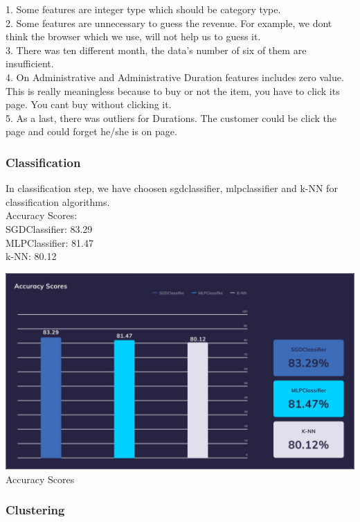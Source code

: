 \documentclass[onecolumn]{article}
\begin{document}
1. Some features are integer type which should be category type.\\
2. Some features are unnecessary to guess the revenue. For example, we dont think the browser which we use, will not help us to guess it.\\
3. There was ten different month, the data's number of six of them are insufficient.\\
4. On Administrative and Administrative Duration features includes zero value. This is really meaningless because to buy or not the item, you have to click its page. You cant buy without clicking it.\\
5. As a last, there was outliers for Durations. The customer could be click the page and could forget he/she is on page.\\



\subsubsection{Classification}
\graphicspath{ {} }
In classification step, we have choosen sgdclassifier, mlpclassifier and k-NN for classification algorithms.\\

Accuracy Scores:\\
SGDClassifier: 83.29\\
MLPClassifier: 81.47\\
k-NN: 80.12


\begin{center}
    \includegraphics[width=.8\textwidth]{accuracy.jpeg}\\
    Accuracy Scores
\end{center}

\subsubsection{Clustering}
\end{document}

